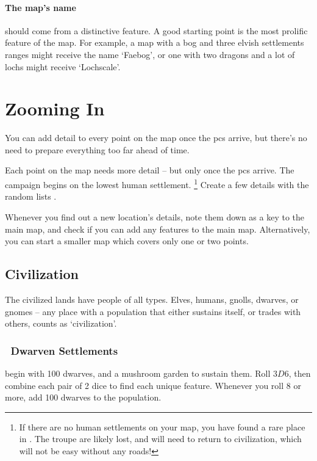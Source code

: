\begin{multicols}{2}
\paragraph{The map's name}
should come from a distinctive feature.
A good starting point is the most prolific feature of the map.
For example, a map with a bog and three elvish settlements ranges might receive the name `Faebog', or one with two dragons and a lot of lochs might receive `Lochscale'.

\end{multicols}

\section{Zooming In}
\label{mapCharacter}

\begin{multicols}{2}

\noindent
You can add detail to every point on the map once the \glspl{pc} arrive, but there's no need to prepare everything too far ahead of time.

Each point on the map needs more detail -- but only once the \glspl{pc} arrive.
The \gls{campaign} begins on the lowest human settlement.%
\footnote{If there are no human settlements on your map, you have found a rare place in .
The troupe are likely lost, and will need to return to civilization, which will not be easy without any roads!}
Create a few details with the random lists .

Whenever you find out a new location's details, note them down as a key to the main map, and check if you can add any features to the main map.
Alternatively, you can start a smaller map which covers only one or two points.

\subsection{Civilization}

The civilized lands have people of all types.
Elves, humans, gnolls, dwarves, or gnomes -- any place with a population that either sustains itself, or trades with others, counts as `civilization'.

\subsubsection[Dwarven Settlements]{\Dw\ Dwarven Settlements}
\label{dwarvenPoint}
begin with 100 dwarves, and a mushroom garden to sustain them.
Roll $3D6$, then combine each pair of 2 dice to find each unique feature.
Whenever you roll 8 or more, add 100 dwarves to the population.


\end{multicols}
